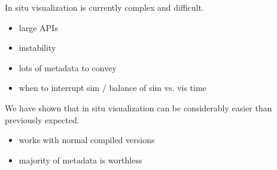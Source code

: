 In situ visualization is currently complex and difficult.
\begin{itemize}
	\item large APIs
	\item instability
	\item lots of metadata to convey
	\item when to interrupt sim / balance of sim vs. vis time
\end{itemize}

We have shown that in situ visualization can be considerably easier
than previously expected.
\begin{itemize}
	\item works with normal compiled versions
	\item majority of metadata is worthless
\end{itemize}
